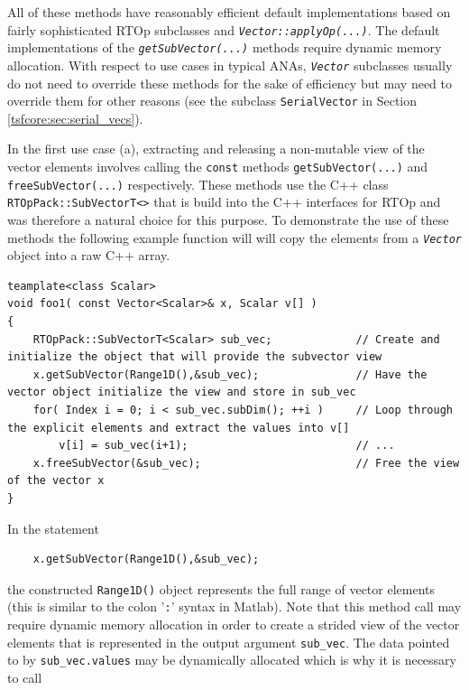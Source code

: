All of these methods have reasonably efficient default implementations
based on fairly sophisticated RTOp subclasses and
\texttt{\textit{Vector::applyOp(\-...)}}.  The default implementations of the
\texttt{\textit{getSubVector(...)}} methods require dynamic memory allocation.
With respect to use cases in typical ANAs, \texttt{\textit{Vector}}
subclasses usually do not need to override these methods for the sake
of efficiency but may need to override them for other reasons (see the
subclass \texttt{SerialVector} in Section
\ref{tsfcore:sec:serial_vecs}).

In the first use case (a), extracting and releasing a non-mutable view of the
vector elements involves calling the \texttt{const} methods
\texttt{getSubVector(...)} and
\texttt{freeSubVector(...)} respectively.  These methods use the C++ class
\texttt{RTOpPack::\-SubVectorT<>} that is build into the C++ interfaces for RTOp
and was therefore a natural choice for this purpose.  To demonstrate
the use of these methods the following example function will will copy
the elements from a \texttt{\textit{Vector}} object into a raw C++
array.

{\tiny\begin{verbatim}
teamplate<class Scalar>
void foo1( const Vector<Scalar>& x, Scalar v[] )
{
    RTOpPack::SubVectorT<Scalar> sub_vec;             // Create and initialize the object that will provide the subvector view
    x.getSubVector(Range1D(),&sub_vec);               // Have the vector object initialize the view and store in sub_vec
    for( Index i = 0; i < sub_vec.subDim(); ++i )     // Loop through the explicit elements and extract the values into v[]
        v[i] = sub_vec(i+1);                          // ...
    x.freeSubVector(&sub_vec);                        // Free the view of the vector x
}
\end{verbatim}}

In the statement

{\tiny\begin{verbatim}
    x.getSubVector(Range1D(),&sub_vec);
\end{verbatim}}

the constructed \texttt{Range1D()} object represents the full range of
vector elements (this is similar to the colon '\texttt{:}' syntax
in Matlab).  Note that this method call may require dynamic memory
allocation in order to create a strided view of the vector elements
that is represented in the output argument \texttt{sub\_vec}.  The
data pointed to by \texttt{sub\_vec.values} may be dynamically
allocated which is why it is necessary to call

